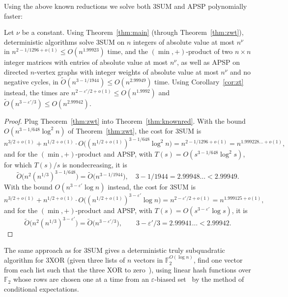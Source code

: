 Using the above known reductions we solve both $3$SUM and APSP polynomially faster:
\begin{theorem}\label{thm:3sumapsp}
Let $\nu$ be a constant. Using Theorem~\ref{thm:main} (through Theorem~\ref{thm:zwt}), deterministic algorithms solve $3$SUM on $n$ integers of absolute value at most $n^\nu$ in $n^{2-1/1296+o(1)}\leq O(n^{1.99923})$ time, and the $(\min,+)$-product of two $n\times n$ integer matrices with entries of absolute value at most $n^\nu$, as well as APSP on directed $n$-vertex graphs with integer weights of absolute value at most $n^\nu$ and no negative cycles, in $\tilde O(n^{3-1/1944})\leq O(n^{2.99949})$ time. Using Corollary~\ref{cor:zt} instead, the times are $n^{2-\varepsilon'/2+o(1)}\leq O(n^{1.9992})$ and $\tilde O(n^{3-\varepsilon'/3})\leq O(n^{2.99942})$.
\end{theorem}
\begin{proof}
Plug Theorem~\ref{thm:zwt} into Theorem~\ref{thm:knownred}. With the bound $O(n^{3-1/648}\log^2n)$ of Theorem~\ref{thm:zwt}, the cost for $3$SUM is
\[
n^{3/2+o(1)}+n^{1/2+o(1)}\cdot O\big((n^{1/2+o(1)})^{3-1/648}\log^2n\big)=n^{2-1/1296+o(1)}=n^{1.999228\ldots+o(1)} ,
\]
and for the $(\min,+)$-product and APSP, with $T(s)=O(s^{3-1/648}\log^2s)$, for which $T(s)/s$ is nondecreasing, it is
\[
\tilde O\big(n^2(n^{1/3})^{3-1/648}\big)=\tilde O\big(n^{3-1/1944}\big),\quad 3-1/1944=2.99948\ldots<2.99949 .
\]
With the bound $O(n^{3-\varepsilon'}\log n)$ instead, the cost for $3$SUM is
\[
n^{3/2+o(1)}+n^{1/2+o(1)}\cdot O\big((n^{1/2+o(1)})^{3-\varepsilon'}\log n\big)=n^{2-\varepsilon'/2+o(1)}=n^{1.999125+o(1)} ,
\]
and for the $(\min,+)$-product and APSP, with $T(s)=O(s^{3-\varepsilon'}\log s)$, it is
\[
\tilde O\big(n^2(n^{1/3})^{3-\varepsilon'}\big)=\tilde O\big(n^{3-\varepsilon'/3}\big),\qquad 3-\varepsilon'/3=2.99941\ldots<2.99942 .
\]
\end{proof}

\begin{remark}[3XOR]\label{rem:3xor}
The same approach as for $3$SUM gives a deterministic truly subquadratic algorithm for 3XOR (given three lists of $n$ vectors in $\mathbb F_2^{O(\log n)}$, find one vector from each list such that the three XOR to zero~\cite{JV16,DSW18}), using linear hash functions over $\mathbb F_2$ whose rows are chosen one at a time from an $\varepsilon$-biased set~\cite{AGHP92} by the method of conditional expectations.
\end{remark}
